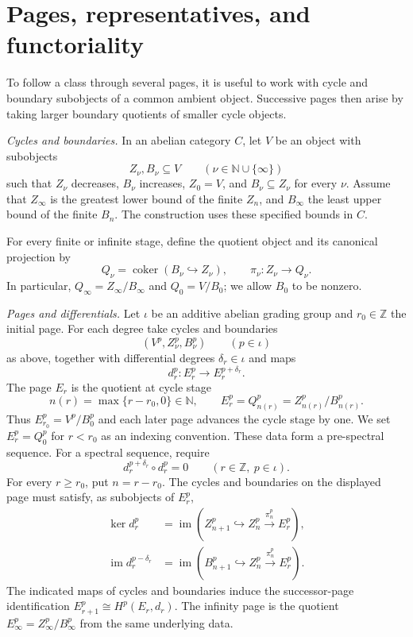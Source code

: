 \section{Pages, representatives, and functoriality}

To follow a class through several pages, it is useful to work with
cycle and boundary subobjects of a common ambient object. Successive
pages then arise by taking larger boundary quotients of smaller cycle
objects.

\begin{definition}
\label{sem:SpectralSequence:subobject-data}
\label{sem:SpectralSequence:pre-sequence}
\label{sem:SpectralSequence:sequence}
\textit{Cycles and boundaries.} In an abelian category $C$, let $V$ be an object with subobjects
\[
 Z_\nu,B_\nu\subseteq V\qquad(\nu\in\mathbb N\cup\{\infty\})
\]
such that $Z_\nu$ decreases, $B_\nu$ increases, $Z_0=V$, and $B_\nu\subseteq Z_\nu$ for every $\nu$. Assume that $Z_\infty$ is the greatest lower bound of the finite $Z_n$, and $B_\infty$ the least upper bound of the finite $B_n$. The construction uses these specified bounds in $C$.

For every finite or infinite stage, define the quotient object and its canonical projection by
\[
 Q_\nu=\operatorname{coker}(B_\nu\hookrightarrow Z_\nu),
 \qquad \pi_\nu:Z_\nu\longrightarrow Q_\nu.
\]
In particular, $Q_\infty=Z_\infty/B_\infty$ and $Q_0=V/B_0$; we allow $B_0$ to be nonzero.

\textit{Pages and differentials.} Let $\iota$ be an additive abelian grading group and $r_0\in\mathbb Z$ the initial page. For each degree take cycles and boundaries
\[
 (V^p,Z_\nu^p,B_\nu^p)\qquad(p\in\iota)
\]
as above, together with differential degrees $\delta_r\in\iota$ and maps
\[
 d_r^p:E_r^p\longrightarrow E_r^{p+\delta_r}.
\]
The page $E_r$ is the quotient at cycle stage
\[
 n(r)=\max\{r-r_0,0\}\in\mathbb N,
 \qquad E_r^p=Q_{n(r)}^p=Z_{n(r)}^p/B_{n(r)}^p.
\]
Thus $E_{r_0}^p=V^p/B_0^p$ and each later page advances the cycle
stage by one. We set $E_r^p=Q_0^p$ for $r<r_0$ as an indexing
convention. These data form a pre-spectral sequence. For a spectral
sequence, require
\[
 d_r^{p+\delta_r}\circ d_r^p=0
 \qquad(r\in\mathbb Z,\ p\in\iota).
\]
For every $r\geq r_0$, put $n=r-r_0$. The cycles and boundaries on the displayed page must satisfy, as subobjects of $E_r^p$,
\[
 \begin{aligned}
 \ker d_r^p
   &=\operatorname{im}(Z_{n+1}^p\hookrightarrow Z_n^p
                          \xrightarrow{\pi_n^p}E_r^p),\\
 \operatorname{im}d_r^{p-\delta_r}
   &=\operatorname{im}(B_{n+1}^p\hookrightarrow Z_n^p
                          \xrightarrow{\pi_n^p}E_r^p).
 \end{aligned}
\]
The indicated maps of cycles and boundaries induce the successor-page identification $E_{r+1}^p\cong H^p(E_r,d_r)$. The infinity page is the quotient $E_\infty^p=Z_\infty^p/B_\infty^p$ from the same underlying data.


\end{definition}
